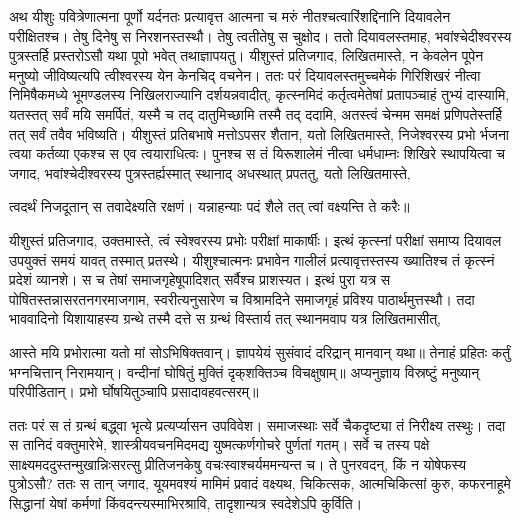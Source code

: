 \adhyAya
{}
\vakya अथ यीशुः पवित्रेणात्मना पूर्णो यर्दनतः प्रत्यावृत्त आत्मना च मरुं नीतश्चत्वारिंशद्दिनानि दियावलेन परीक्षितश्च।
\vakya तेषु दिनेषु स निरशनस्तस्थौ। तेषु त्वतीतेषु स चुक्षोद।
\vakya ततो दियावलस्तमाह, भवांश्चेदीश्वरस्य पुत्रस्तर्हि प्रस्तरोऽसौ यथा पूपो भवेत् तथाज्ञापयतु।
\vakya यीशुस्तं प्रतिजगाद, लिखितमास्ते, न केवलेन पूपेन मनुष्यो जीविष्यत्यपि त्वीश्वरस्य येन केनचिद् वचनेन।
\vakya ततः परं दियावलस्तमुच्चमेकं गिरिशिखरं नीत्वा निमिषैकमध्ये भूमण्डलस्य निखिलराज्यानि दर्शयन्नवादीत्,
\vakya कृत्स्नमिदं कर्तृत्वमेतेषां प्रतापञ्चाहं तुभ्यं दास्यामि, यतस्तत् सर्वं मयि समर्पितं, यस्मै च तद् दातुमिच्छामि तस्मै तद् ददामि,
\vakya अतस्त्वं चेन्मम समक्षं प्रणिपतेस्तर्हि तत् सर्वं तवैव भविष्यति।
\vakya यीशुस्तं प्रतिबभाषे मत्तोऽपसर शैतान, यतो लिखितमास्ते, निजेश्वरस्य प्रभो र्भजना त्वया कर्तव्या एकश्च स एव त्वयाराधित्वः।
\vakya पुनश्च स तं यिरूशालेमं नीत्वा धर्मधाम्नः शिखिरे स्थापयित्वा च जगाद, भवांश्चेदीश्वरस्य पुत्रस्तर्ह्यस्मात् स्थानाद् अधस्थात् प्रपततु, यतो लिखितमास्ते,
\begin{poem}
\startwithvakya त्वदर्थं निजदूतान् स तवादेक्ष्यति रक्षणं।
\vakya यन्नाहन्याः पदं शैले तत् त्वां वक्ष्यन्ति ते करैः॥
\end{poem}
\vakya यीशुस्तं प्रतिजगाद, उक्तमास्ते, त्वं स्वेश्वरस्य प्रभोः परीक्षां माकार्षीः।
\vakya इत्थं कृत्स्नां परीक्षां समाप्य दियावल उपयुक्तं समयं यावत् तस्मात् प्रतस्थे।
\vakya यीशुश्चात्मनः प्रभावेन गालीलं प्रत्यावृत्तस्तस्य ख्यातिश्च तं कृत्स्नं प्रदेशं व्यानशे।
\vakya स च तेषां समाजगृहेषूपादिशत् सर्वैश्च प्राशस्यत।
\vakya इत्थं पुरा यत्र स पोषितस्तन्नासरतनगरमाजगाम, स्वरीत्यनुसारेण च विश्रामदिने समाजगृहं प्रविश्य पाठार्थमुत्तस्थौ।
\vakya तदा भाववादिनो यिशायाहस्य ग्रन्थे तस्मै दत्ते स ग्रन्थं विस्तार्य तत् स्थानमवाप यत्र लिखितमासीत्,
\begin{poem}
\startwithvakya आस्ते मयि प्रभोरात्मा यतो मां सोऽभिषिक्तवान्।
\pline ज्ञापयेयं सुसंवादं दरिद्रान् मानवान् यथा॥
\pline तेनाहं प्रहितः कर्तुं भग्नचित्तान् निरामयान्।
\pline वन्दीनां घोषितुं मुक्तिं दृक्‌शक्तिञ्च विचक्षुषाम्॥
\pline अप्यनुज्ञाय विस्रष्टुं मनुष्यान् परिपीडितान्।
\vakya प्रभो र्घोषयितुञ्चापि प्रसादावहवत्सरम्॥
\end{poem}
\vakya ततः परं स तं ग्रन्थं बद्ध्वा भृत्ये प्रत्यर्प्यासन उपविवेश। समाजस्थाः सर्वे चैकदृष्ट्या तं निरीक्ष्य तस्थुः।
\vakya तदा स तानिदं वक्तुमारेभे, शास्त्रीयवचनमिदमद्य युष्मत्कर्णगोचरे पुर्णतां गतम्।
\vakya सर्वे च तस्य पक्षे साक्ष्यमददुस्तन्मुखान्निःसरत्सु प्रीतिजनकेषु वचःस्वाश्चर्यममन्यन्त च। ते पुनरवदन्, किं न योषेफस्य पुत्रोऽसौ?
\vakya ततः स तान् जगाद, यूयमवश्यं मामिमं प्रवादं वक्ष्यथ, चिकित्सक, आत्मचिकित्सां कुरु, कफरनाहूमे सिद्धानां येषां कर्मणां किंवदन्त्यस्माभिरश्रावि, तादृशान्यत्र स्वदेशेऽपि कुर्विति।

